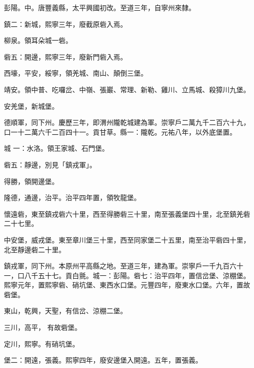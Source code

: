 \begin{pinyinscope}
 彭陽。中。唐豐義縣，太平興國初改。至道三年，自寧州來隸。



 鎮二：新城，熙寧三年，廢截原砦入焉。



 柳泉。領耳朵城一砦。



 砦五：開邊，熙寧三年，廢新門砦入焉。



 西壕，平安，綏寧，領羌城、南山、顛倒三堡。



 靖安。領中普、吃囉岔、中嶺、張巖、常理、新勒、雞川、立馬城、殺獐川九堡。



 安羌堡，新城堡。



 德順軍，同下州。慶歷三年，即渭州隴乾城建為軍。崇寧戶二萬九千二百六十九，口一十二萬六千二百四十一。貢甘草。縣一：隴乾。元祐八年，以外底堡置。



 城
 一：水洛。領王家城、石門堡。



 砦五：靜邊，別見「鎮戎軍」。



 得勝，領開邊堡。



 隆德，通邊，治平。治平四年置，領牧龍堡。



 懷遠砦，東至鎮戎砦六十里，西至得勝砦三十里，南至張義堡四十里，北至鎮羌砦二十七里。



 中安堡，威戎堡。東至章川堡三十里，西至同家堡二十五里，南至治平砦四十里，北至靜邊砦二十里。



 鎮戎軍，同下州。本原州平高縣之地。至道三年，建為軍。崇寧戶一千九百六十一，口八千五十七。貢白氈。城一：彭陽。砦七：治平四年，置信岔堡、涼棚堡。熙寧元年，置熙寧砦、硝坑堡、東西水口堡。元豐四年，廢東水口堡。六年，置故砦堡。



 東山，乾興，天聖，有信岔、涼棚二堡。



 三川，高平，
 有故砦堡。



 定川，熙寧。有硝坑堡。



 堡二：開遠，張義。熙寧四年，廢安邊堡入開遠。五年，置張義。




\end{pinyinscope}
